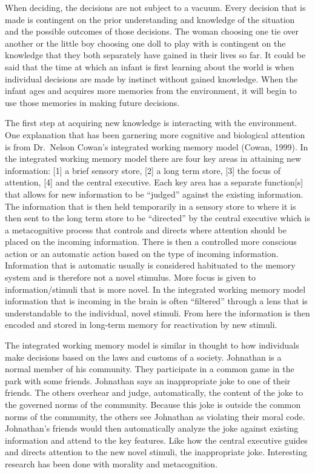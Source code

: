 \documentclass[
  donotrepeattitle,doc, 12pt, a4paper,floatsintext]{apa7}
\begin{document}
When deciding, the decisions are not subject to a vacuum. Every decision that is made is contingent on the prior understanding and knowledge of the situation and the possible outcomes of those decisions. The woman choosing one tie over another or the little boy choosing one doll to play with is contingent on the knowledge that they both separately have gained in their lives so far. It could be said that the time at which an infant is first learning about the world is when individual decisions are made by instinct without gained knowledge. When the infant ages and acquires more memories from the environment, it will begin to use those memories in making future decisions.

The first step at acquiring new knowledge is interacting with the environment. One explanation that has been garnering more cognitive and biological attention is from Dr.~Nelson Cowan's integrated working memory model (Cowan, 1999). In the integrated working memory model there are four key areas in attaining new information: {[}1{]} a brief sensory store, {[}2{]} a long term store, {[}3{]} the focus of attention, {[}4{]} and the central executive. Each key area has a separate function{[}s{]} that allows for new information to be ``judged'' against the existing information. The information that is then held temporarily in a sensory store to where it is then sent to the long term store to be ``directed'' by the central executive which is a metacognitive process that controls and directs where attention should be placed on the incoming information. There is then a controlled more conscious action or an automatic action based on the type of incoming information. Information that is automatic usually is considered habituated to the memory system and is therefore not a novel stimulus. More focus is given to information/stimuli that is more novel. In the integrated working memory model information that is incoming in the brain is often ``filtered'' through a lens that is understandable to the individual, novel stimuli. From here the information is then encoded and stored in long-term memory for reactivation by new stimuli.

The integrated working memory model is similar in thought to how individuals make decisions based on the laws and customs of a society. Johnathan is a normal member of his community. They participate in a common game in the park with some friends. Johnathan says an inappropriate joke to one of their friends. The others overhear and judge, automatically, the content of the joke to the governed norms of the community. Because this joke is outside the common norms of the community, the others see Johnathan as violating their moral code. Johnathan's friends would then automatically analyze the joke against existing information and attend to the key features. Like how the central executive guides and directs attention to the new novel stimuli, the inappropriate joke. Interesting research has been done with morality and metacognition.
\end{document}
